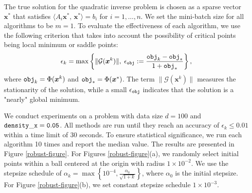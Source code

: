 \documentclass[twoside,11pt]{article}
\newcommand{\cG}{\mathcal G}
\def\inprod#1#2{\langle#1,\,#2\rangle}
\def\eps{\epsilon}
\def\vx{{\bm{x}}}
\begin{document}
The {true} solution for the quadratic inverse problem is chosen as a sparse vector $\vx^*$ that satisfies $\inprod{A_i\vx^*}{\vx^*}=b_i$ for $i=1,\dots,n$. We set the mini-batch size for all algorithms to be $m=1$. To evaluate the effectiveness of each algorithm, we use the following criterion that takes into account the possibility of critical points being local minimum or saddle points:
\[
\epsilon_k=\max\left\{\|\cG({\vx^k})\|,\;\epsilon_{\tt obj}:=\frac{{\tt obj}_k-{\tt obj}_*}{1+{\tt obj}_*}\right\},
\]
 where ${\tt obj}_k=\Phi({\vx^k})$ and ${\tt obj}_*=\Phi(\vx^*)$. 
 {The term $\|\cG(\vx^k)\|$ measures the stationarity of the solution, while a small $\eps_{\tt obj}$ indicates that the solution is a "nearly" global minimum.}

We conduct experiments on a problem with data size $d=100$ and ${\tt density\_x=0.05}$. All methods are run until they reach an accuracy of $\epsilon_k\leq0.01$ within a time limit of 30 seconds. To ensure statistical significance, we run each algorithm 10 times and report the median value. The results are presented in Figure \ref{robust-figure}. For Figures \ref{robust-figure}(a), we randomly select initial points within a ball centered at the origin with radius $1\times10^{-2}$. We use the stepsize schedule of $\alpha_k=\max\left\{10^{-4},\frac{\alpha_0}{\sqrt{1+k}}\right\}$, where $\alpha_0$ is the initial stepsize. For Figure \ref{robust-figure}(b), we set constant stepsize schedule $1\times10^{-3}$. 
\end{document}
